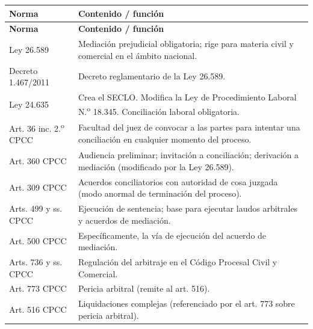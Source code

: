 \documentclass[12pt,oneside]{book}
\begin{document}
\begin{longtable}{
    >{\raggedright\arraybackslash}p{}
    >{\raggedright\arraybackslash}p{}
}
\toprule
\textbf{Norma} & \textbf{Contenido / función} \\
\midrule
\endfirsthead
\toprule
\textbf{Norma} & \textbf{Contenido / función} \\
\midrule
\endhead
\bottomrule
\endfoot
\bottomrule
\endlastfoot

Ley 26.589 & Mediación prejudicial obligatoria; rige para materia civil y comercial en el ámbito nacional. \\
Decreto 1.467/2011 & Decreto reglamentario de la Ley 26.589. \\
Ley 24.635 & Crea el SECLO. Modifica la Ley de Procedimiento Laboral N.\textsuperscript{o} 18.345. Conciliación laboral obligatoria. \\
Art. 36 inc. 2.\textsuperscript{o} CPCC & Facultad del juez de convocar a las partes para intentar una conciliación en cualquier momento del proceso. \\
Art. 360 CPCC & Audiencia preliminar; invitación a conciliación; derivación a mediación (modificado por la Ley 26.589). \\
Art. 309 CPCC & Acuerdos conciliatorios con autoridad de cosa juzgada (modo anormal de terminación del proceso). \\
Arts. 499 y ss. CPCC & Ejecución de sentencia; base para ejecutar laudos arbitrales y acuerdos de mediación. \\
Art. 500 CPCC & Específicamente, la vía de ejecución del acuerdo de mediación. \\
Arts. 736 y ss. CPCC & Regulación del arbitraje en el Código Procesal Civil y Comercial. \\
Art. 773 CPCC & Pericia arbitral (remite al art. 516). \\
Art. 516 CPCC & Liquidaciones complejas (referenciado por el art. 773 sobre pericia arbitral). \\

\end{longtable}
\end{document}
